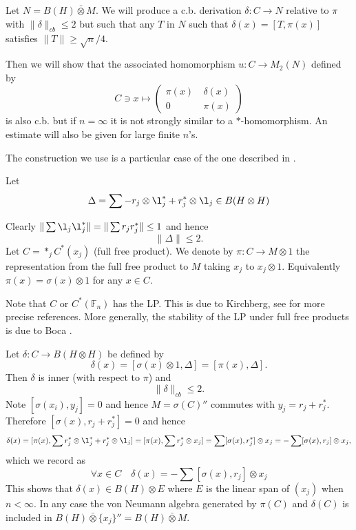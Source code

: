 \documentclass[11pt,leqno]{article}
\newcommand{\bb}[1]{\mathbb{#1}}
\theoremstyle{plain}
\theoremstyle{definition}
\theoremstyle{remark}
\numberwithin{equation}{section}
\def\F{\bb F}
\def\d{\delta}
\def\F{\bb F}
\def\d{\delta}
\begin{document}
       Let $N=B(H)\bar \otimes M$.
              We will produce a c.b. derivation $\d : C \to  N$
       relative to $\pi$
       with $\|\d\|_{cb} \le 2$ but such that any $T$ in $N$
       such that $\d(x)=[T, \pi(x)]$ satisfies 
       $\|T\|\ge \sqrt n/4$. 
       
        
       Then we will show that the associated homomorphism
       $u: C \to M_2(N)$
       defined by
       $$C\ni x \mapsto \left( \begin{matrix} \pi(x)  & \ \d(x)\\ 0& \ \pi(x )   \end{matrix}  \right)$$ 
       is also c.b. but if $n=\infty$ it is not strongly similar to a $*$-homomorphism.
       An estimate will also be    given for large finite $n$'s.
       
       
       The construction we use is a particular case of the one described in \cite{toho}.
       
       Let $$\Delta= \sum  - r_j \otimes \l_j^*+r_j^* \otimes \l_j \in B(H\otimes H)$$
       
       Clearly $\| \sum \l_j \l_j^* \|= \| \sum r_j r_j^* \| \le 1$ and hence
       $$\|\Delta\|\le 2.$$
       Let $C=\ast_j C^*(x_j)$ (full free product).
       We denote by $\pi:  C\to M \otimes 1$ the representation from the full free product to $M$
       taking $x_j$   to  $x_j \otimes 1$. Equivalently $\pi(x)=\sigma(x) \otimes 1$ for any $x\in C$.
       
       Note that $C$  or $C^*(\F_n)$ has the LP. This is   due to Kirchberg, see  \cite{157} for more precise references. More generally,
       the stability of the LP under full free products is due to Boca \cite{boca}.
       
       Let $\d : C \to B(H\otimes H)$ be defined by
       $$\d(x)= [\sigma(x) \otimes 1 , \Delta]=[\pi(x)   , \Delta] .$$
       Then $\d $ is inner (with respect to  $\pi$)  and   \begin{equation}  \label{e0}
       \|\d\|_{cb} \le 2.\end{equation}
   Note $[\sigma(x_i),y_j]=0$ and hence  $M=\sigma(C)''$ commutes with $y_j=r_j+r_j^*$.
  Therefore $[\sigma(x) , r_j+r_j^*]=0$ and hence     
       $$ \d(x)=  [\pi(x) , \sum r_j^* \otimes \l_j^* +r_j^* \otimes \l_j] = 
       [\pi(x) , \sum r_j^* \otimes x_j  ] = \sum [\sigma(x)  ,   r_j^*] \otimes x_j   = -\sum [\sigma(x)  ,   r_j ] \otimes x_j ,$$
       which we record as
       \begin{equation}  \label{e12}
      \forall x\in C\quad   \d(x)= -\sum [\sigma(x)  ,   r_j ] \otimes x_j 
        \end{equation}
    This shows that   $\d(x)\in B(H) \otimes E$ where $E$ is the linear span
    of $(x_j)$ when $n<\infty$. In any case
   the
     von Neumann algebra  generated by $\pi(C)$ and $\d(C)$ is included in $B(H)\bar\otimes \{x_j\}'' =B(H)\bar {\otimes} M$.
       
\end{document}

